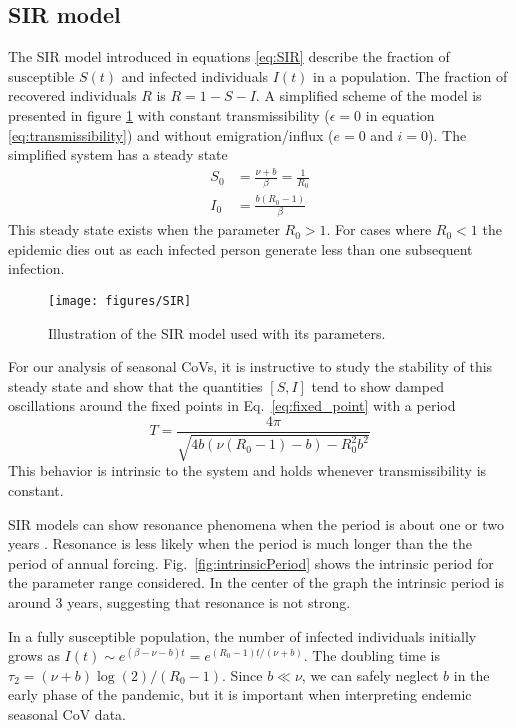 \documentclass[rmp, reprint, superscriptaddress, floatfix,amsmath]{revtex4-1}
\begin{document}
\subsection{SIR model}

The SIR model introduced in equations \ref{eq:SIR} describe the fraction of susceptible $S(t)$ and infected individuals $I(t)$ in a population. 
The fraction of recovered individuals $R$ is $R=1 - S - I$. 
A simplified scheme of the model is presented in figure \ref{fig:schemeSIR} with constant transmissibility ($\epsilon=0$ in equation \ref{eq:transmissibility}) and without emigration/influx ($e=0$ and $i=0$).
The simplified system has a steady state
\begin{equation}
\begin{split}
S_0 &= \frac{\nu + b}{\beta} = \frac{1}{R_0} \\
I_0 & = \frac{b(R_0-1)}{\beta}
\end{split}
\label{eq:fixed_point}
\end{equation}
This steady state exists when the parameter $R_0 > 1$. For cases where $R_0 < 1$ the epidemic dies out as each infected person generate less than one subsequent infection. 

\begin{figure}[htb]
	\centering
	\texttt{[image: figures/SIR]}
	\caption{Illustration of the SIR model used with its parameters.}\label{fig:schemeSIR}
\end{figure}


For our analysis of seasonal CoVs, it is instructive to study the stability of this steady state and show that the quantities $[S,I]$ tend to show damped oscillations around the fixed points in Eq.~\ref{eq:fixed_point} with a period
\begin{equation}
T = \frac{4\pi}{\sqrt{4b(\nu(R_0-1) - b) - R_0^2b^2}}
\label{eq:period}
\end{equation}
This behavior is intrinsic to the system and holds whenever transmissibility is constant.

SIR models can show resonance phenomena when the period is about one or two years \citep{dushoff_dynamical_2004,chen_regular_2017}.
Resonance is less likely when the period is much longer than the the period of annual forcing.
Fig.~\ref{fig:intrinsicPeriod} shows the intrinsic period for the parameter range considered. 
In the center of the graph the intrinsic period is around 3 years, suggesting that resonance is not strong.

In a fully susceptible population, the number of infected individuals initially grows as $I(t)\sim e^{(\beta-\nu-b)t} = e^{(R_0-1)t/(\nu+b)}$.
The doubling time is $\tau_2 = (\nu+b)\log(2)/(R_0-1)$.
Since $b\ll \nu$, we can safely neglect $b$ in the early phase of the pandemic, but it is important when interpreting endemic seasonal CoV data. 
\end{document}

